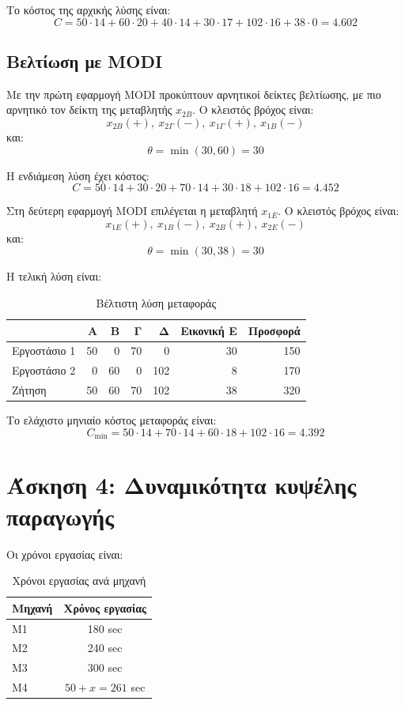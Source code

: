 \documentclass[12pt,a4paper]{article}
\begin{document}
Το κόστος της αρχικής λύσης είναι:
\[
C=50\cdot14+60\cdot20+40\cdot14+30\cdot17+102\cdot16+38\cdot0=4.602
\]

\subsection{Βελτίωση με MODI}

Με την πρώτη εφαρμογή MODI προκύπτουν αρνητικοί δείκτες βελτίωσης, με πιο αρνητικό τον δείκτη της μεταβλητής \(x_{2B}\). Ο κλειστός βρόχος είναι:
\[
x_{2B}(+),\ x_{2\Gamma}(-),\ x_{1\Gamma}(+),\ x_{1B}(-)
\]
και:
\[
\theta=\min(30,60)=30
\]

Η ενδιάμεση λύση έχει κόστος:
\[
C=50\cdot14+30\cdot20+70\cdot14+30\cdot18+102\cdot16=4.452
\]

Στη δεύτερη εφαρμογή MODI επιλέγεται η μεταβλητή \(x_{1E}\). Ο κλειστός βρόχος είναι:
\[
x_{1E}(+),\ x_{1B}(-),\ x_{2B}(+),\ x_{2E}(-)
\]
και:
\[
\theta=\min(30,38)=30
\]

Η τελική λύση είναι:

\begin{table}[H]
\centering
\caption{Βέλτιστη λύση μεταφοράς}
\begin{tabular}{lrrrrrr}
\toprule
 & \textbf{Α} & \textbf{Β} & \textbf{Γ} & \textbf{Δ} & \textbf{Εικονική Ε} & \textbf{Προσφορά} \\
\midrule
Εργοστάσιο 1 & 50 & 0 & 70 & 0 & 30 & 150 \\
Εργοστάσιο 2 & 0 & 60 & 0 & 102 & 8 & 170 \\
\midrule
Ζήτηση & 50 & 60 & 70 & 102 & 38 & 320 \\
\bottomrule
\end{tabular}
\end{table}

Το ελάχιστο μηνιαίο κόστος μεταφοράς είναι:
\[
C_{\min}=50\cdot14+70\cdot14+60\cdot18+102\cdot16=4.392
\]

\section{Άσκηση 4: Δυναμικότητα κυψέλης παραγωγής}

Οι χρόνοι εργασίας είναι:

\begin{table}[H]
\centering
\caption{Χρόνοι εργασίας ανά μηχανή}
\begin{tabular}{lc}
\toprule
\textbf{Μηχανή} & \textbf{Χρόνος εργασίας} \\
\midrule
Μ1 & 180 sec \\
Μ2 & 240 sec \\
Μ3 & 300 sec \\
Μ4 & \(50+x=261\) sec \\
\bottomrule
\end{tabular}
\end{table}
\end{document}
